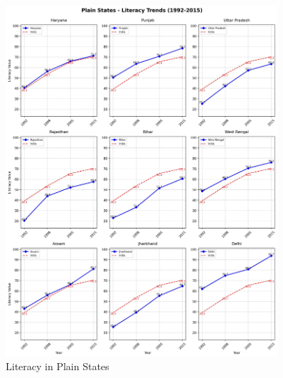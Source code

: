 \begin{figure}[H]
    \centering
    \includegraphics[width=0.9\textwidth]{figures/nfhs/plain_states_literacy_subplots.pdf}
    \caption{Literacy in Plain States}
    \label{fig:nfhs_plain_literacy}
\end{figure}

